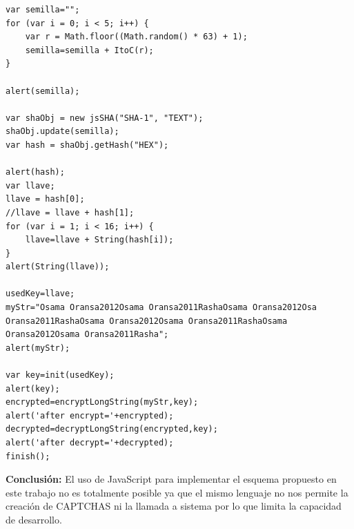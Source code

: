 \begin{lstlisting}[frame=single]
 var semilla="";
for (var i = 0; i < 5; i++) {
	var r = Math.floor((Math.random() * 63) + 1);
	semilla=semilla + ItoC(r);
}

alert(semilla);

var shaObj = new jsSHA("SHA-1", "TEXT");
shaObj.update(semilla);
var hash = shaObj.getHash("HEX");

alert(hash);
var llave;
llave = hash[0];
//llave = llave + hash[1];
for (var i = 1; i < 16; i++) {
	llave=llave + String(hash[i]);
}
alert(String(llave));

usedKey=llave;
myStr="Osama Oransa2012Osama Oransa2011RashaOsama Oransa2012Osa  
Oransa2011RashaOsama Oransa2012Osama Oransa2011RashaOsama 
Oransa2012Osama Oransa2011Rasha";
alert(myStr);

var key=init(usedKey);
alert(key);
encrypted=encryptLongString(myStr,key);
alert('after encrypt='+encrypted);
decrypted=decryptLongString(encrypted,key);
alert('after decrypt='+decrypted);
finish();

\end{lstlisting}
\textbf{Conclusión:} El uso de JavaScript para implementar el esquema propuesto en este trabajo no es totalmente posible ya que el mismo lenguaje no nos permite la creación de CAPTCHAS ni la llamada a sistema por lo que limita la capacidad de desarrollo.

